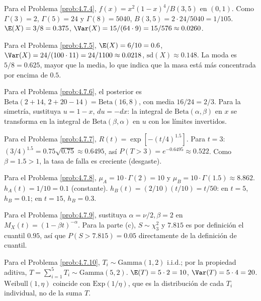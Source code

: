 \begin{sugerencia}
	\label{sug:4.7.4}
	Para el Problema \ref{prob:4.7.4}, $f(x) = x^{2}(1-x)^{4}/B(3,5)$ en $(0,1)$. Como $\Gamma(3)=2$, $\Gamma(5)=24$ y $\Gamma(8)=5040$, $B(3,5) = 2\cdot 24/5040 = 1/105$. $\E(X)=3/8=0.375$, $\Var(X)=15/(64\cdot 9)=15/576\approx 0.0260$.
\end{sugerencia}

\begin{sugerencia}
	\label{sug:4.7.5}
	Para el Problema \ref{prob:4.7.5}, $\E(X)=6/10=0.6$, $\Var(X)=24/(100\cdot 11)=24/1100\approx 0.0218$, $\text{sd}(X)\approx 0.148$. La moda es $5/8=0.625$, mayor que la media, lo que indica que la masa está más concentrada por encima de $0.5$.
\end{sugerencia}

\begin{sugerencia}
	\label{sug:4.7.6}
	Para el Problema \ref{prob:4.7.6}, el posterior es $\text{Beta}(2+14,\,2+20-14)=\text{Beta}(16,8)$, con media $16/24=2/3$. Para la simetría, sustituya $u=1-x$, $du=-dx$: la integral de $\text{Beta}(\alpha,\beta)$ en $x$ se transforma en la integral de $\text{Beta}(\beta,\alpha)$ en $u$ con los límites invertidos.
\end{sugerencia}

\begin{sugerencia}
	\label{sug:4.7.7}
	Para el Problema \ref{prob:4.7.7}, $R(t)=\exp[-(t/4)^{1.5}]$. Para $t=3$: $(3/4)^{1.5}=0.75\sqrt{0.75}\approx 0.6495$, así $P(T>3)=e^{-0.6495}\approx 0.522$. Como $\beta=1.5>1$, la tasa de falla es creciente (desgaste).
\end{sugerencia}

\begin{sugerencia}
	\label{sug:4.7.8}
	Para el Problema \ref{prob:4.7.8}, $\mu_A = 10\cdot\Gamma(2)=10$ y $\mu_B=10\cdot\Gamma(1.5)\approx 8.862$. $h_A(t)=1/10=0.1$ (constante). $h_B(t)=(2/10)(t/10)=t/50$: en $t=5$, $h_B=0.1$; en $t=15$, $h_B=0.3$.
\end{sugerencia}

\begin{sugerencia}
	\label{sug:4.7.9}
	Para el Problema \ref{prob:4.7.9}, sustituya $\alpha=\nu/2,\beta=2$ en $M_X(t)=(1-\beta t)^{-\alpha}$. Para la parte (c), $S\sim\chi^{2}_{3}$ y $7.815$ es por definición el cuantil $0.95$, así que $P(S>7.815)=0.05$ directamente de la definición de cuantil.
\end{sugerencia}

\begin{sugerencia}
	\label{sug:4.7.10}
	Para el Problema \ref{prob:4.7.10}, $T_i \sim \text{Gamma}(1,2)$ i.i.d.; por la propiedad aditiva, $T=\sum_{i=1}^{5}T_i \sim \text{Gamma}(5,2)$. $\E(T)=5\cdot 2=10$, $\Var(T)=5\cdot 4=20$. $\text{Weibull}(1,\eta)$ coincide con $\text{Exp}(1/\eta)$, que es la distribución de cada $T_i$ individual, no de la suma $T$.
\end{sugerencia}

